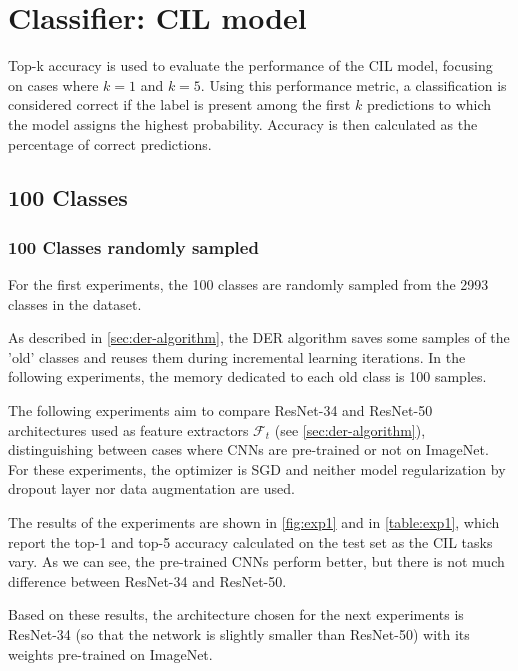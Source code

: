 \section{Classifier: CIL model}
\label{sec:exp-cil}
Top-k accuracy is used to evaluate the performance of the CIL model, focusing on cases where $k=1$ and $k=5$.
Using this performance metric, a classification is considered correct if the label is present among the first $k$ predictions to which the model assigns the highest probability.
Accuracy is then calculated as the percentage of correct predictions.

\subsection{100 Classes}
\subsubsection{100 Classes randomly sampled}
For the first experiments, the 100 classes are randomly sampled from the 2993 classes in the dataset.



As described in \autoref{sec:der-algorithm}, the DER algorithm saves some samples of the 'old' classes and reuses them during incremental learning iterations.
In the following experiments, the memory dedicated to each old class is 100 samples.

The following experiments aim to compare ResNet-34 and ResNet-50 architectures used as feature extractors $\mathcal{F}_t$ (see \autoref{sec:der-algorithm}), distinguishing between cases where CNNs are pre-trained or not on ImageNet.
For these experiments, the optimizer is SGD and neither model regularization by dropout layer nor data augmentation are used.

The results of the experiments are shown in \autoref{fig:exp1} and in \autoref{table:exp1}, which report the top-1 and top-5 accuracy calculated on the test set as the CIL tasks vary. As we can see, the pre-trained CNNs perform better, but there is not much difference between ResNet-34 and ResNet-50.

Based on these results, the architecture chosen for the next experiments is ResNet-34 (so that the network is slightly smaller than ResNet-50) with its weights pre-trained on ImageNet.

